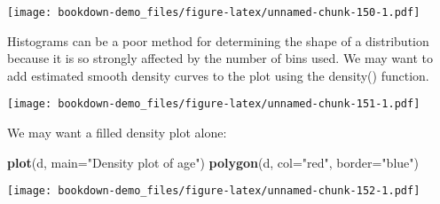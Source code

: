 \documentclass[]{book}
\newenvironment{Shaded}{\begin{snugshade}}{\end{snugshade}}
\newcommand{\KeywordTok}[1]{\textcolor[rgb]{0.13,0.29,0.53}{\textbf{#1}}}
\newcommand{\DataTypeTok}[1]{\textcolor[rgb]{0.13,0.29,0.53}{#1}}
\newcommand{\DecValTok}[1]{\textcolor[rgb]{0.00,0.00,0.81}{#1}}
\newcommand{\FloatTok}[1]{\textcolor[rgb]{0.00,0.00,0.81}{#1}}
\newcommand{\StringTok}[1]{\textcolor[rgb]{0.31,0.60,0.02}{#1}}
\newcommand{\OperatorTok}[1]{\textcolor[rgb]{0.81,0.36,0.00}{\textbf{#1}}}
\newcommand{\NormalTok}[1]{#1}
\theoremstyle{definition}
\theoremstyle{definition}
\theoremstyle{definition}
\theoremstyle{remark}
\begin{document}
\begin{Shaded}
\end{Shaded}

\texttt{[image: bookdown-demo\_files/figure-latex/unnamed-chunk-150-1.pdf]}

Histograms can be a poor method for determining the shape of a
distribution because it is so strongly affected by the number of bins
used. We may want to add estimated smooth density curves to the plot
using the density() function.

\begin{Shaded}
\end{Shaded}

\texttt{[image: bookdown-demo\_files/figure-latex/unnamed-chunk-151-1.pdf]}

We may want a filled density plot alone:

\begin{Shaded}
\begin{Highlighting}[]
\KeywordTok{plot}\NormalTok{(d, }\DataTypeTok{main=}\StringTok{"Density plot of age"}\NormalTok{)}
\KeywordTok{polygon}\NormalTok{(d, }\DataTypeTok{col=}\StringTok{"red"}\NormalTok{, }\DataTypeTok{border=}\StringTok{"blue"}\NormalTok{)}
\end{Highlighting}
\end{Shaded}

\texttt{[image: bookdown-demo\_files/figure-latex/unnamed-chunk-152-1.pdf]}
\end{document}
